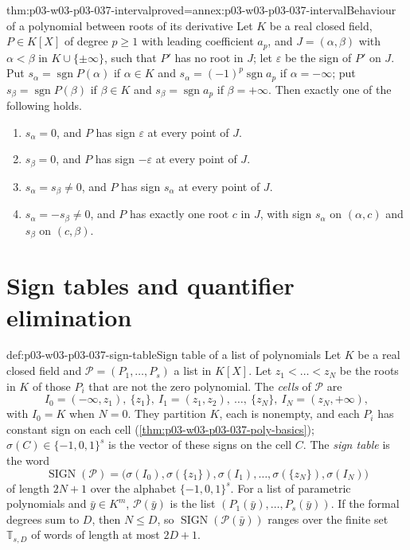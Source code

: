 \begin{hblemma}{thm:p03-w03-p03-037-interval}{proved=annex:p03-w03-p03-037-interval}{Behaviour of a polynomial between roots of its derivative}
Let \(K\) be a real closed field, \(P\in K[X]\) of degree \(p\geq1\) with
leading coefficient \(a_p\), and \(J=(\alpha,\beta)\) with
\(\alpha<\beta\) in \(K\cup\{\pm\infty\}\), such that \(P'\) has no root in
\(J\); let \(\varepsilon\) be the sign of \(P'\) on \(J\).  Put
\(s_\alpha=\operatorname{sgn}P(\alpha)\) if \(\alpha\in K\) and
\(s_\alpha=(-1)^p\operatorname{sgn}a_p\) if \(\alpha=-\infty\); put
\(s_\beta=\operatorname{sgn}P(\beta)\) if \(\beta\in K\) and
\(s_\beta=\operatorname{sgn}a_p\) if \(\beta=+\infty\).  Then exactly one
of the following holds.
\begin{enumerate}
\item \(s_\alpha=0\), and \(P\) has sign \(\varepsilon\) at every point of \(J\).
\item \(s_\beta=0\), and \(P\) has sign \(-\varepsilon\) at every point of \(J\).
\item \(s_\alpha=s_\beta\neq0\), and \(P\) has sign \(s_\alpha\) at every point
  of \(J\).
\item \(s_\alpha=-s_\beta\neq0\), and \(P\) has exactly one root \(c\) in
  \(J\), with sign \(s_\alpha\) on \((\alpha,c)\) and \(s_\beta\) on
  \((c,\beta)\).
\end{enumerate}
\end{hblemma}

\section{Sign tables and quantifier elimination}
\label{sec:p03-w03-p03-037-qe}

\begin{hbdefinition}{def:p03-w03-p03-037-sign-table}{Sign table of a list of polynomials}
Let \(K\) be a real closed field and \(\mathcal P=(P_1,\dots,P_s)\) a list in
\(K[X]\).  Let \(z_1<\dots<z_N\) be the roots in \(K\) of those \(P_i\) that
are not the zero polynomial.  The \emph{cells} of \(\mathcal P\) are
\[
I_0=(-\infty,z_1),\ \{z_1\},\ I_1=(z_1,z_2),\ \dots,\ \{z_N\},\
I_N=(z_N,+\infty),
\]
with \(I_0=K\) when \(N=0\).  They partition \(K\), each is nonempty, and
each \(P_i\) has constant sign on each cell
(\cref{thm:p03-w03-p03-037-poly-basics}); \(\sigma(C)\in\{-1,0,1\}^s\) is the
vector of these signs on the cell \(C\).  The \emph{sign table} is the word
\[
\operatorname{SIGN}(\mathcal P)=
\bigl(\sigma(I_0),\sigma(\{z_1\}),\sigma(I_1),\dots,
\sigma(\{z_N\}),\sigma(I_N)\bigr)
\]
of length \(2N+1\) over the alphabet \(\{-1,0,1\}^s\).  For a list of
parametric polynomials and \(\bar y\in K^m\), \(\mathcal P(\bar y)\) is the
list \((P_1(\bar y),\dots,P_s(\bar y))\).  If the formal degrees sum to
\(D\), then \(N\leq D\), so \(\operatorname{SIGN}(\mathcal P(\bar y))\)
ranges over the finite set \(\mathbb T_{s,D}\) of words of length at most
\(2D+1\).
\end{hbdefinition}

